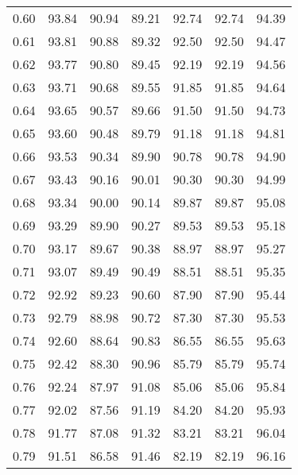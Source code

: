 \begin{tabular}{|c|c|c|c|c|c|c|}
      0.60 &     93.84 &     90.94 &      89.21 &   92.74 &      92.74 &         94.39 \\
      0.61 &     93.81 &     90.88 &      89.32 &   92.50 &      92.50 &         94.47 \\
      0.62 &     93.77 &     90.80 &      89.45 &   92.19 &      92.19 &         94.56 \\
      0.63 &     93.71 &     90.68 &      89.55 &   91.85 &      91.85 &         94.64 \\
      0.64 &     93.65 &     90.57 &      89.66 &   91.50 &      91.50 &         94.73 \\
      0.65 &     93.60 &     90.48 &      89.79 &   91.18 &      91.18 &         94.81 \\
      0.66 &     93.53 &     90.34 &      89.90 &   90.78 &      90.78 &         94.90 \\
      0.67 &     93.43 &     90.16 &      90.01 &   90.30 &      90.30 &         94.99 \\
      0.68 &     93.34 &     90.00 &      90.14 &   89.87 &      89.87 &         95.08 \\
      0.69 &     93.29 &     89.90 &      90.27 &   89.53 &      89.53 &         95.18 \\
      0.70 &     93.17 &     89.67 &      90.38 &   88.97 &      88.97 &         95.27 \\
      0.71 &     93.07 &     89.49 &      90.49 &   88.51 &      88.51 &         95.35 \\
      0.72 &     92.92 &     89.23 &      90.60 &   87.90 &      87.90 &         95.44 \\
      0.73 &     92.79 &     88.98 &      90.72 &   87.30 &      87.30 &         95.53 \\
      0.74 &     92.60 &     88.64 &      90.83 &   86.55 &      86.55 &         95.63 \\
      0.75 &     92.42 &     88.30 &      90.96 &   85.79 &      85.79 &         95.74 \\
      0.76 &     92.24 &     87.97 &      91.08 &   85.06 &      85.06 &         95.84 \\
      0.77 &     92.02 &     87.56 &      91.19 &   84.20 &      84.20 &         95.93 \\
      0.78 &     91.77 &     87.08 &      91.32 &   83.21 &      83.21 &         96.04 \\
      0.79 &     91.51 &     86.58 &      91.46 &   82.19 &      82.19 &         96.16 \\

\end{tabular}
